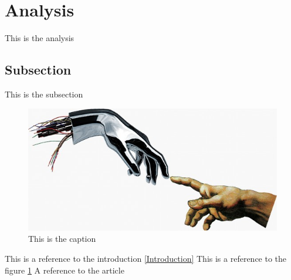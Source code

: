 \section{Analysis}
\label{Analysis}
This is the analysis
\subsection{Subsection}
This is the subsection
\begin{figure}[H]
    \centering
    \includegraphics[width = \textwidth/2]{Images/medialogi.jpeg}
    \caption{This is the caption}
    \label{figurelabel}
\end{figure}
This is a reference to the introduction \ref{Introduction} \newline
This is a reference to the figure \ref{figurelabel} \newline
A reference to the article \parencite{thearticle}